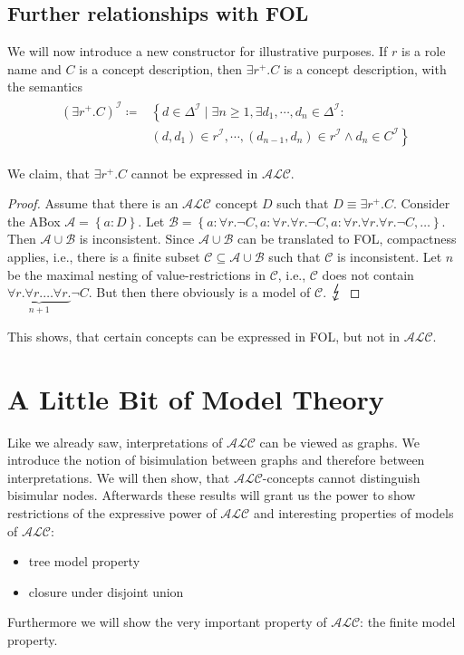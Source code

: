 \section{Further relationships with FOL}
We will now introduce a new constructor for illustrative purposes.
If $r$ is a role name and $C$ is a concept description, then $\exists r^+.C $
is a concept description, with the semantics
\begin{align*}
	\begin{split}
		(\exists r^+.C)^\mathcal{I} \coloneqq &\left\{ d \in \Delta^{\mathcal{I}} \mid \exists n \geq 1, \exists d_1,\cdots, d_n \in \Delta^\mathcal{I} : \right.\\
											  &\left. (d,d_1) \in r^\mathcal{I}, \cdots, (d_{n-1},d_n) \in r^\mathcal{I} \land d_n \in C^\mathcal{I}\right\}
	\end{split}
\end{align*}

We claim, that $\exists r^+.C$ cannot be expressed in $\mathcal{ALC}$.
\begin{proof}
	Assume that there is an $\mathcal{ALC}$ concept $D$ such that $D \equiv \exists r^+.C$.
	Consider the ABox $\mathcal{A} = \left\{ a:D \right\}$.
	Let $ \mathcal{B} = \left\{ a : \forall r.\neg C, a: \forall r.\forall r.\neg C, a:\forall r.\forall r.\forall r.\neg C,\ldots \right\}$.
	Then $\mathcal{A} \cup \mathcal{B}$ is inconsistent.
	Since $\mathcal{A} \cup \mathcal{B}$ can be translated to FOL, compactness applies, i.e.,
	there is a finite subset $\mathcal{C} \subseteq \mathcal{A} \cup \mathcal{B}$ such that $\mathcal{C}$ is inconsistent.
	Let $n$ be the maximal nesting of value-restrictions in $\mathcal{C}$, i.e.,
	$\mathcal{C}$ does not contain $\underbrace{\forall r. \forall r. \ldots \forall r.}_{n+1} \neg C$.
	But then there obviously is a model of $\mathcal{C}$. $\contra$
\end{proof}
This shows, that certain concepts can be expressed in FOL, but not in $\mathcal{ALC}$.

\chapter{A Little Bit of Model Theory}
Like we already saw, interpretations of $\mathcal{ALC}$ can be viewed as graphs.
We introduce the notion of bisimulation between graphs and therefore between interpretations.
We will then show, that $\mathcal{ALC}$-concepts cannot distinguish bisimular nodes.
Afterwards these results will grant us the power to show restrictions of the expressive power of $\mathcal{ALC}$ and
interesting properties of models of $\mathcal{ALC}$:
\begin{itemize}
	\item tree model property
	\item closure under disjoint union
\end{itemize}
Furthermore we will show the very important property of $\mathcal{ALC}$: the finite model property.

